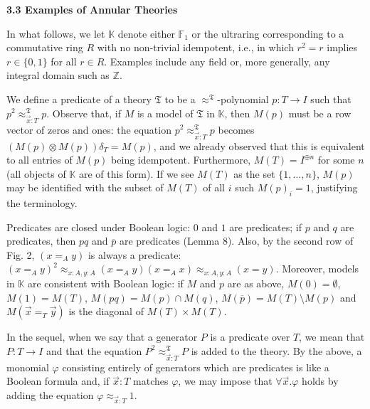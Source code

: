 \par\medskip\noindent\textbf{3.3 Examples of Annular Theories}\par
 
 
In what follows, we let $\mathbb{K}$ denote either $\mathbb{F}_{1}$ or the ultraring corresponding to a commutative ring $R$ with no non-trivial idempotent, i.e., in which $r^{2}=r$ implies $r\in\{0,1\}$ for all $r\in R$. Examples include any field or, more generally, any integral domain such as $\mathbb{Z}$.\par
 
 
 
We define a predicate of a theory $\mathfrak{T}$ to be a $\approx^{\mathfrak{T}}$-polynomial $p:T\to I$ such that $p^{2}\approx_{\vec{x}:T}^{\mathfrak{T}}p$. Observe that, if $M$ is a model of $\mathfrak{T}$ in $\mathbb{K}$, then $M(p)$ must be a row vector of zeros and ones: the equation $p^{2}\approx_{\vec{x}:T}^{\mathfrak{T}}p$ becomes $(M(p)\otimes M(p))\delta_{T}=M(p)$, and we already observed that this is equivalent to all entries of $M(p)$ being idempotent. Furthermore, $M(T)=I^{\oplus n}$ for some $n$ (all objects of $\mathbb{K}$ are of this form). If we see $M(T)$ as the set $\{1,\ldots,n\}$, $M(p)$ may be identified with the subset of $M(T)$ of all $i$ such $M(p)_{i}=1$, justifying the terminology.\par
 
 
 
Predicates are closed under Boolean logic: $0$ and $1$ are predicates; if $p$ and $q$ are predicates, then $pq$ and $\overline{p}$ are predicates (Lemma 8). Also, by the second row of Fig. 2, $(x=_{A}y)$ is always a predicate: $(x=_{A}y)^{2}\approx_{x:A,y:A}(x=_{A}y)(x=_{A}x)\approx_{x:A,y:A}(x=y)$. Moreover, models in $\mathbb{K}$ are consistent with Boolean logic: if $M$ and $p$ are as above, $M(0)=\emptyset$, $M(1)=M(T)$, $M(pq)=M(p)\cap M(q)$, $M(\overline{p})=M(T)\setminus M(p)$ and $M(\vec{x}=_{T}\vec{y})$ is the diagonal of $M(T)\times M(T)$.\par
 
 
 
In the sequel, when we say that a generator $P$ is a predicate over $T$, we mean that $P:T\to I$ and that the equation $P^{2}\approx_{\vec{x}:T}^{\mathfrak{T}}P$ is added to the theory. By the above, a monomial $\varphi$ consisting entirely of generators which are predicates is like a Boolean formula and, if $\vec{x}:T$ matches $\varphi$, we may impose that $\forall\vec{x}.\varphi$ holds by adding the equation $\varphi\approx_{\vec{x}:T}1$.\par
 

